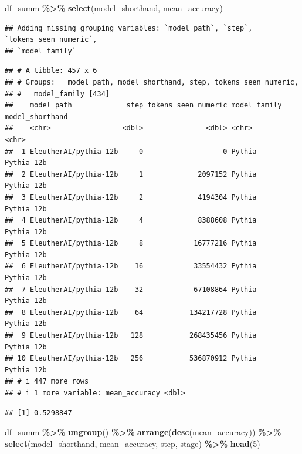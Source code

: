 \documentclass[
]{article}
\newenvironment{Shaded}{\begin{snugshade}}{\end{snugshade}}
\newcommand{\DecValTok}[1]{\textcolor[rgb]{0.00,0.00,0.81}{#1}}
\newcommand{\FunctionTok}[1]{\textcolor[rgb]{0.13,0.29,0.53}{\textbf{#1}}}
\newcommand{\NormalTok}[1]{#1}
\newcommand{\SpecialCharTok}[1]{\textcolor[rgb]{0.81,0.36,0.00}{\textbf{#1}}}
\begin{document}
\begin{Shaded}
\begin{Highlighting}[]
\NormalTok{df\_summ }\SpecialCharTok{\%\textgreater{}\%}
  \FunctionTok{select}\NormalTok{(model\_shorthand, mean\_accuracy)}
\end{Highlighting}
\end{Shaded}

\begin{verbatim}
## Adding missing grouping variables: `model_path`, `step`, `tokens_seen_numeric`,
## `model_family`
\end{verbatim}

\begin{verbatim}
## # A tibble: 457 x 6
## # Groups:   model_path, model_shorthand, step, tokens_seen_numeric,
## #   model_family [434]
##    model_path             step tokens_seen_numeric model_family model_shorthand
##    <chr>                 <dbl>               <dbl> <chr>        <chr>          
##  1 EleutherAI/pythia-12b     0                   0 Pythia       Pythia 12b     
##  2 EleutherAI/pythia-12b     1             2097152 Pythia       Pythia 12b     
##  3 EleutherAI/pythia-12b     2             4194304 Pythia       Pythia 12b     
##  4 EleutherAI/pythia-12b     4             8388608 Pythia       Pythia 12b     
##  5 EleutherAI/pythia-12b     8            16777216 Pythia       Pythia 12b     
##  6 EleutherAI/pythia-12b    16            33554432 Pythia       Pythia 12b     
##  7 EleutherAI/pythia-12b    32            67108864 Pythia       Pythia 12b     
##  8 EleutherAI/pythia-12b    64           134217728 Pythia       Pythia 12b     
##  9 EleutherAI/pythia-12b   128           268435456 Pythia       Pythia 12b     
## 10 EleutherAI/pythia-12b   256           536870912 Pythia       Pythia 12b     
## # i 447 more rows
## # i 1 more variable: mean_accuracy <dbl>
\end{verbatim}

\begin{Shaded}
\end{Shaded}

\begin{verbatim}
## [1] 0.5298847
\end{verbatim}

\begin{Shaded}
\begin{Highlighting}[]
\NormalTok{df\_summ }\SpecialCharTok{\%\textgreater{}\%}
  \FunctionTok{ungroup}\NormalTok{() }\SpecialCharTok{\%\textgreater{}\%}
  \FunctionTok{arrange}\NormalTok{(}\FunctionTok{desc}\NormalTok{(mean\_accuracy)) }\SpecialCharTok{\%\textgreater{}\%}
  \FunctionTok{select}\NormalTok{(model\_shorthand, mean\_accuracy, step, stage) }\SpecialCharTok{\%\textgreater{}\%}
  \FunctionTok{head}\NormalTok{(}\DecValTok{5}\NormalTok{)}
\end{Highlighting}
\end{Shaded}
\end{document}
